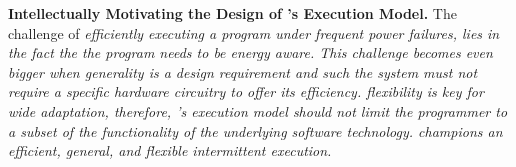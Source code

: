 \textbf{Intellectually Motivating the Design of \sys's Execution Model.}  
The challenge of \em{efficiently} executing a program under frequent power failures, lies in the fact the the program needs to be energy aware. This challenge becomes even bigger when \em{generality} is a design requirement and such the system must not require a specific hardware circuitry to offer its efficiency. \em{flexibility} is key for wide adaptation, therefore, \sys's execution model should not limit the programmer to a subset of the functionality of the underlying software  technology. \em{\sys champions an efficient, general, and flexible intermittent execution.}




























































